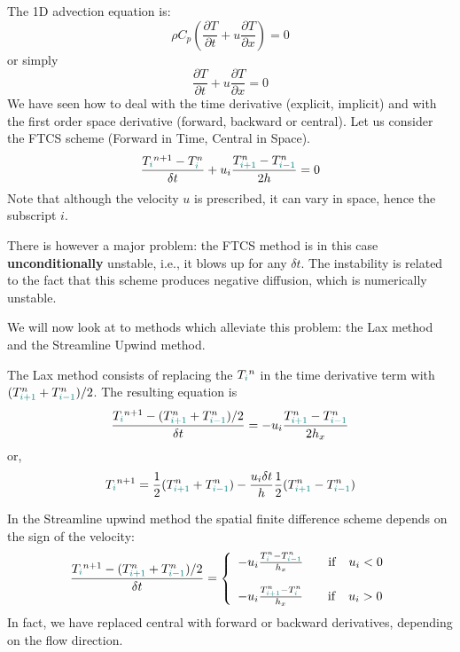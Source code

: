 
%


The 1D advection equation is:
\begin{equation}
\rho C_p \left( \frac{\partial T}{\partial t}  
+ u \frac{\partial T}{\partial x} \right)=0 
\end{equation}
or simply
\begin{equation}
\frac{\partial T}{\partial t} + u \frac{\partial T}{\partial x}=0 
\end{equation}
We have seen how to deal with the time derivative (explicit, implicit) 
and with the first order space derivative (forward, backward or central).
Let us consider the FTCS scheme (Forward in Time, Central in Space).
\[
\frac{T_{\color{teal}i}^{n+1}-T^n_{\color{teal}i}}{\delta t} 
+ u_i \frac{T^n_{\color{teal}i+1} - T^n_{{\color{teal}i-1}}}{2h} =0 
\]
Note that although the velocity $u$ is prescribed, it can vary in space, hence
the subscript $i$. 

There is however a major problem: 
the FTCS method is in this case {\bf unconditionally} unstable, i.e., it blows up for any $\delta t$.
The instability is related to the fact that this scheme produces negative diffusion, 
which is numerically unstable.

We will now look at to methods which alleviate this problem: the Lax method and the Streamline Upwind method.

The {\color{olive} Lax method} consists of replacing the $T_{\color{teal}i}^n$ 
in the time derivative term with $(T_{{\color{teal}i+1}}^n + T_{{\color{teal}i-1}}^n)/2$. 
The resulting equation is
\[
\frac{T_{\color{teal}i}^{n+1}-  (T_{{\color{teal}i+1}}^n + T_{{\color{teal}i-1}}^n)/2 }{\delta t} 
= - u_i \frac{T^n_{{\color{teal}i+1}}-T^n_{{\color{teal}i-1}}}{2 h_x}
\]
or, 
\[
T_{\color{teal}i}^{n+1} = \frac{1}{2} (T_{{\color{teal}i+1}}^n + T_{{\color{teal}i-1}}^n)  
- \frac{u_i \delta t}{h}  \frac{1}{2} (T^n_{{\color{teal}i+1}}-T^n_{{\color{teal}i-1}})
\]



In the {\color{olive}Streamline upwind} method the spatial finite difference scheme 
depends on the sign of the velocity:
\[
\frac{T_{\color{teal}i}^{n+1}-  (T_{{\color{teal}i+1}}^n + T_{{\color{teal}i-1}}^n)/2   }{\delta t} =
\left\{
\begin{array}{l}
 - u_i \frac{T^n_{{\color{teal}i}}-T^n_{{\color{teal}i-1}}}{h_x}  \quad\quad  {\rm if} \quad u_i<0\\ \\
 - u_i \frac{T^n_{{\color{teal}i+1}}-T^n_{{\color{teal}i}}}{h_x}  \quad\quad  {\rm if} \quad u_i>0
\end{array}
\right.
\]
In fact, we have replaced central with forward or backward derivatives, depending on the flow direction. 


